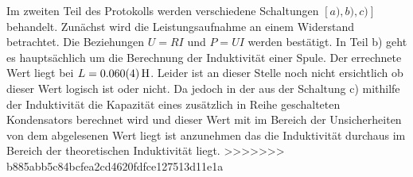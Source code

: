 Im zweiten Teil des Protokolls werden verschiedene Schaltungen  $\left[ a),b),c) \right]$ behandelt.
Zunächst wird die Leistungsaufnahme an einem Widerstand betrachtet. Die Beziehungen $U=RI$ und $P=UI$ werden bestätigt.
In Teil b) geht es hauptsächlich um die Berechnung der Induktivität einer Spule.
Der errechnete Wert liegt bei $L= \SI{0,060+-0,004}{H}$. Leider ist an dieser Stelle noch nicht ersichtlich ob dieser Wert 
logisch ist oder nicht. %
Da jedoch in der aus der Schaltung c) mithilfe der Induktivität die Kapazität eines zusätzlich in Reihe geschalteten Kondensators berechnet wird und dieser Wert mit im Bereich der Unsicherheiten von dem abgelesenen Wert liegt ist anzunehmen das die Induktivität durchaus im Bereich der theoretischen Induktivität liegt.
>>>>>>> b885abb5c84bcfea2cd4620fdfce127513d11e1a
